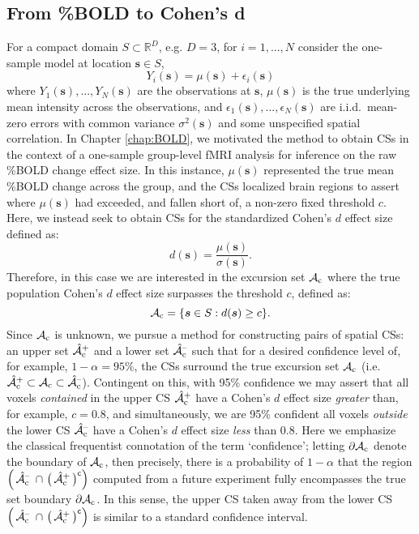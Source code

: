 \subsection{From \%BOLD to Cohen's d}
\label{sec:BOLD_to_cohen}
For a compact domain $S \subset \mathbb{R}^{D}$, e.g. $D = 3$, for $i = 1, ..., N$  consider the one-sample model at location $\bm{s} \in S$,
\begin{equation}
\label{eq:Cohen_GLM}
Y_{i}(\bm{s}) = \mu(\bm{s}) + \epsilon_{i}(\bm{s})
\end{equation}
where $Y_{1}(\bm{s}), ..., Y_{N}(\bm{s})$ are the observations at $\bm{s}$, $\mu(\bm{s})$ is the true underlying mean intensity across the observations,  
and $\epsilon_{1}(\bm{s}), ..., \epsilon_{N}(\bm{s})$ are i.i.d.\ mean-zero errors with common variance $\sigma^2(\bm{s})$ and some unspecified spatial correlation. In Chapter \ref{chap:BOLD}, we motivated the method to obtain CSs in the context of a one-sample group-level fMRI analysis for inference on the raw \%BOLD change effect size. In this instance, $\mu(\bm{s})$ represented the true mean \%BOLD change across the group, and the CSs localized brain regions to assert where $\mu(\bm{s})$ had exceeded, and fallen short of, a non-zero fixed threshold $c$. Here, we instead seek to obtain CSs for the standardized Cohen's $d$ effect size defined as:
\begin{equation}
\label{eq:cohens_d}
d(\bm{s}) = \frac{\mu(\bm{s})}{\sigma(\bm{s})}.
\end{equation}
Therefore, in this case we are interested in the excursion set $\operatorname{\mathcal{A}_{c}}$ where the true population Cohen's $d$ effect size surpasses the threshold $c$, defined as: 
\begin{equation}
\label{eq:Ac}
\operatorname{\mathcal{A}_{c}} = \{\bm{s} \in S : d(\bm{s}) \geq c \}.
\end{equation}
Since $\operatorname{\mathcal{A}_{c}}$ is unknown, we pursue a method for constructing pairs of spatial CSs: an upper set $\operatorname{\hat{\mathcal{A}}_{c}^+}$ and a lower set $\operatorname{\hat{\mathcal{A}}_{c}^{\textrm{--}}}$ such that for a desired confidence level of, for example, $1 - \alpha = 95\%$, the CSs surround the true excursion set $\operatorname{\mathcal{A}_{c}}$ (i.e. $\operatorname{\hat{\mathcal{A}}_{c}^+} \subset \operatorname{\mathcal{A}_{c}} \subset \operatorname{\hat{\mathcal{A}}_{c}^{\textrm{--}}}$). Contingent on this, with 95\% confidence we may assert that all voxels \textit{contained} in the upper CS $\operatorname{\hat{\mathcal{A}}_{c}^+}$ have a Cohen's $d$ effect size \textit{greater} than, for example, $c = 0.8$, and simultaneously, we are 95\% confident all voxels \textit{outside} the lower CS $\operatorname{\hat{\mathcal{A}}_{c}^{\textrm{--}}}$ have a Cohen's $d$ effect size \textit{less} than 0.8. Here we emphasize the classical frequentist connotation of the term `confidence'; letting $\operatorname{\partial\mathcal{A}_{c}}$ denote the boundary of $\operatorname{\mathcal{A}_{c}}$, then precisely, there is a probability of $1 - \alpha$ that the region $\Big(\Ahatcm \ \cap \ \big(\Ahatcp\big)^{\mathsf{c}}\Big)$ computed from a future experiment fully encompasses the true set boundary $\operatorname{\partial\mathcal{A}_{c}}$. In this sense, the upper CS taken away from the lower CS $\Big(\Ahatcm \ \cap \ \big(\Ahatcp\big)^{\mathsf{c}}\Big)$ is similar to a standard confidence interval. 

